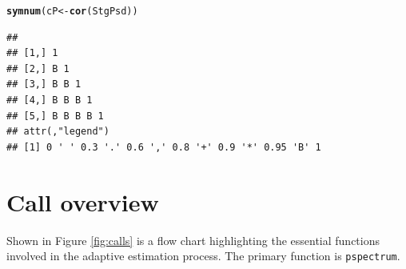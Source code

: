 \documentclass[10pt]{article}\usepackage{graphicx, color}
\makeatletter
\newcommand{\hlfunctioncall}[1]{\textcolor[rgb]{0.501960784313725,0,0.329411764705882}{\textbf{#1}}}%
\newenvironment{kframe}{%
 \def\at@end@of@kframe{}%
 \ifinner\ifhmode%
  \def\at@end@of@kframe{\end{minipage}}%
  \begin{minipage}{\columnwidth}%
 \fi\fi%
 \def\FrameCommand##1{\hskip\@totalleftmargin \hskip-\fboxsep
 \colorbox{shadecolor}{##1}\hskip-\fboxsep
     \hskip-\linewidth \hskip-\@totalleftmargin \hskip\columnwidth}%
 \MakeFramed {\advance\hsize-\width
   \@totalleftmargin\z@ \linewidth\hsize
   \@setminipage}}%
 {\par\unskip\endMakeFramed%
 \at@end@of@kframe}
\newenvironment{knitrout}{}{} %
\newcommand{\Rcmd}[1]{\texttt{#1}}
\makeatother
\begin{document}
\begin{knitrout}
\color{fgcolor}\begin{kframe}
\begin{alltt}
\hlfunctioncall{symnum}(cP <- \hlfunctioncall{cor}(StgPsd))
\end{alltt}
\begin{verbatim}
##               
## [1,] 1        
## [2,] B 1      
## [3,] B B 1    
## [4,] B B B 1  
## [5,] B B B B 1
## attr(,"legend")
## [1] 0 ' ' 0.3 '.' 0.6 ',' 0.8 '+' 0.9 '*' 0.95 'B' 1
\end{verbatim}
\end{kframe}
\end{knitrout}



\section{Call overview}

Shown
in Figure \ref{fig:calls}
is a flow chart 
highlighting the essential
functions involved in the adaptive estimation
process. The primary function is \Rcmd{pspectrum}.
\end{document}
